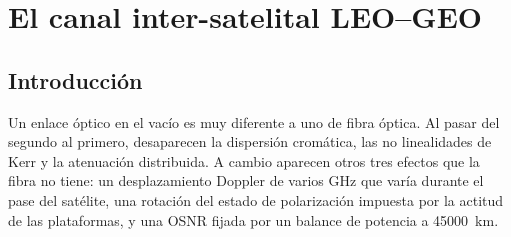 
\chapter{El canal inter-satelital LEO--GEO}
\label{cap:canal}

\section{Introducci\'on}
\label{sec:canal-intro}

Un enlace \'optico en el vac\'io es muy diferente a uno de fibra \'optica. Al pasar del segundo al primero, desaparecen la
dispersi\'on crom\'atica, las no linealidades de Kerr y la atenuaci\'on
distribuida. A cambio aparecen otros tres efectos que la fibra no tiene: un
desplazamiento Doppler de varios \si{\giga\hertz} que var\'ia
durante el pase del sat\'elite, una rotaci\'on del estado de polarizaci\'on impuesta
por la actitud de las plataformas, y una OSNR fijada por
un balance de potencia a \SI{45000}{\kilo\metre}.

